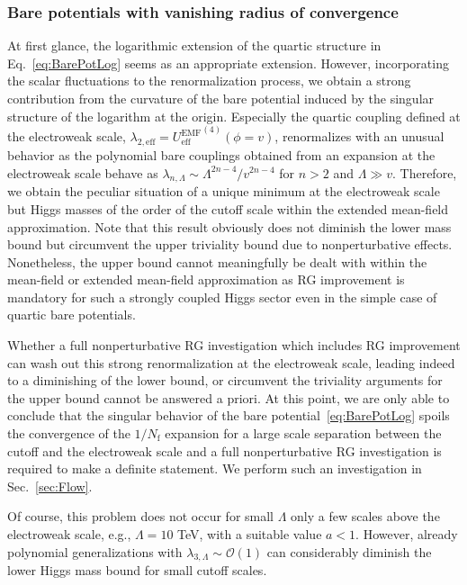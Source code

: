 \documentclass[twocolumn,aps,prd,showpacs,nofootinbib,superscriptaddress,preprintnumbers,floatfix,10pt]{revtex4-1}
\newcommand{\Nf}{N_{\mathrm{f}}}
\newcommand{\UEMF}{U^{\mathrm{EMF}}_{\mathrm{eff}}}
\begin{document}
\subsubsection{Bare potentials with vanishing radius of convergence}
At first glance, the logarithmic extension of the quartic structure in Eq.~\eqref{eq:BarePotLog} seems as an appropriate extension. However, incorporating the scalar fluctuations to the renormalization process, we obtain a strong contribution from the curvature of the bare potential induced by the singular structure of the logarithm at the origin. Especially the quartic coupling defined at the electroweak scale, $\lambda_{2,\mathrm{eff}} = {\UEMF}^{(4)}(\phi=v)$, renormalizes with an unusual behavior as the polynomial bare couplings obtained from an expansion at the electroweak scale behave as $\lambda_{n,\Lambda} \sim \Lambda^{2n-4}/v^{2n-4}$ for $n>2$ and $\Lambda \gg v$. Therefore, we obtain the peculiar situation of a unique minimum at the electroweak scale but Higgs masses of the order of the cutoff scale within the extended mean-field approximation. Note that this result obviously does not diminish the lower mass bound but circumvent the upper triviality bound due to nonperturbative effects. Nonetheless, the upper bound cannot meaningfully be dealt with within the mean-field or extended mean-field approximation as RG improvement is mandatory for such a strongly coupled Higgs sector even in the simple case of quartic bare potentials. 

Whether a full nonperturbative RG investigation which includes RG improvement can wash out this strong renormalization at the electroweak scale, leading indeed to a diminishing of the lower bound, or circumvent the triviality arguments for the upper bound cannot be answered a priori. 
At this point, we are only able to conclude that the singular behavior of the bare potential~\eqref{eq:BarePotLog} spoils the convergence of the $1/\Nf$ expansion for a large scale separation between the cutoff and the electroweak scale and a full nonperturbative RG investigation is required to make a definite statement.%
We perform such an investigation in Sec.~\ref{sec:Flow}.
%

Of course, this problem does not occur for small $\Lambda$ only a few scales above the electroweak scale, e.g., {$\Lambda = 10$ TeV}, with a suitable value $a<1$. 
However, already polynomial generalizations with $\lambda_{3,\Lambda} \sim \mathcal{O}(1)$ can considerably diminish the lower Higgs mass bound for small cutoff scales.
\end{document}
